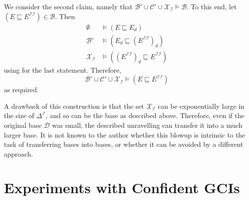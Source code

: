 \begin{Proof}
  We consider the second claim, namely that $\mathcal{B}' \cup \mathcal{C}' \cup
  \mathcal{X}_{\mathcal{I}} \models \mathcal{B}$.  To this end, let $(E \sqsubseteq
  E^{\mathcal{I}\mathcal{I}}) \in \mathcal{B}$.  Then
  \begin{align*}
    \emptyset &\models (E \sqsubseteq E_d)\\
    \mathcal{B}' &\models (E_d \sqsubseteq (E^{\mathcal{I}\mathcal{I}})_d)\\
    \mathcal{X}_{\mathcal{I}} &\models ((E^{\mathcal{I}\mathcal{I}})_d \sqsubseteq E^{\mathcal{I}\mathcal{I}})
  \end{align*}
  using  for the last statement.  Therefore,
  \begin{equation*}
    \mathcal{B}' \cup \mathcal{C}' \cup \mathcal{X}_{\mathcal{I}} \models (E \sqsubseteq
    E^{\mathcal{I}\mathcal{I}})
  \end{equation*}
  as required.
\end{Proof}

A drawback of this construction is that the set $\mathcal{X}_{\mathcal{I}}$ can be
exponentially large in the size of $\Delta^{\mathcal{I}}$, and so can be the \ELbot base
as described above.  Therefore, even if the original base $\mathcal{D}$ was small, the
described unravelling can transfer it into a much larger base.  It is not known to the
author whether this blowup is intrinsic to the task of transferring \ELgfpbot bases into
\ELbot bases, or whether it can be avoided by a different approach.

\section{Experiments with Confident GCIs}
\label{sec:exper-with-conf}

%


